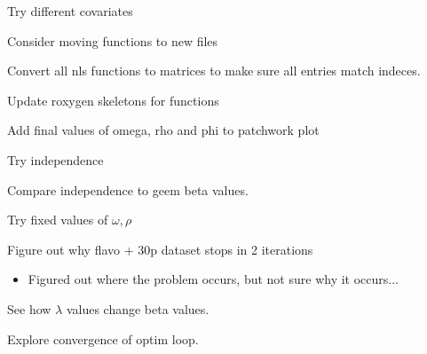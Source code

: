 \documentclass[10pt]{article}
\theoremstyle{definition}
\begin{document}
\begin{todolist}
  \item Try different covariates
  \item Consider moving functions to new files
  \item Convert all nls functions to matrices to make sure all entries match indeces.
  \item Update roxygen skeletons for functions
  \item Add final values of omega, rho and phi to patchwork plot
    \item Try independence
    \item Compare independence to geem beta values.
    \item Try fixed values of $\omega, \rho$
  \item Figure out why flavo + 30p dataset stops in 2 iterations
  \begin{itemize}
    \item Figured out where the problem occurs, but not sure why it occurs...
  \end{itemize}
  \item See how $\lambda$ values change beta values.
  \item Explore convergence of optim loop.

\end{todolist}
\end{document}
